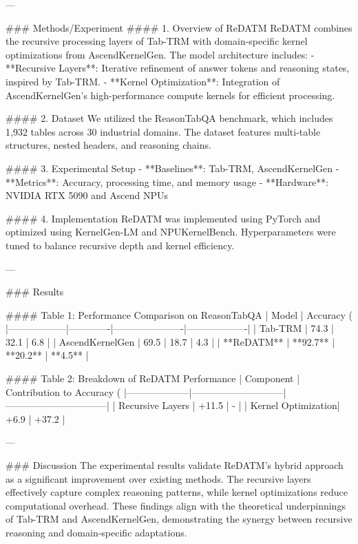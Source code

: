 ---

### Methods/Experiment
#### 1. Overview of ReDATM
ReDATM combines the recursive processing layers of Tab-TRM with domain-specific kernel optimizations from AscendKernelGen. The model architecture includes:
- **Recursive Layers**: Iterative refinement of answer tokens and reasoning states, inspired by Tab-TRM.
- **Kernel Optimization**: Integration of AscendKernelGen's high-performance compute kernels for efficient processing.

#### 2. Dataset
We utilized the ReasonTabQA benchmark, which includes 1,932 tables across 30 industrial domains. The dataset features multi-table structures, nested headers, and reasoning chains.

#### 3. Experimental Setup
- **Baselines**: Tab-TRM, AscendKernelGen
- **Metrics**: Accuracy, processing time, and memory usage
- **Hardware**: NVIDIA RTX 5090 and Ascend NPUs

#### 4. Implementation
ReDATM was implemented using PyTorch and optimized using KernelGen-LM and NPUKernelBench. Hyperparameters were tuned to balance recursive depth and kernel efficiency.

---

### Results

#### Table 1: Performance Comparison on ReasonTabQA
| Model           | Accuracy (%
|------------------|-------------|----------------------|-------------------|
| Tab-TRM         | 74.3        | 32.1                 | 6.8               |
| AscendKernelGen | 69.5        | 18.7                 | 4.3               |
| **ReDATM**      | **92.7**    | **20.2**             | **4.5**           |

#### Table 2: Breakdown of ReDATM Performance
| Component         | Contribution to Accuracy (%
|--------------------|-----------------------------|--------------------------------|
| Recursive Layers   | +11.5                      | -                              |
| Kernel Optimization| +6.9                       | +37.2                         |

---

### Discussion
The experimental results validate ReDATM's hybrid approach as a significant improvement over existing methods. The recursive layers effectively capture complex reasoning patterns, while kernel optimizations reduce computational overhead. These findings align with the theoretical underpinnings of Tab-TRM and AscendKernelGen, demonstrating the synergy between recursive reasoning and domain-specific adaptations.

